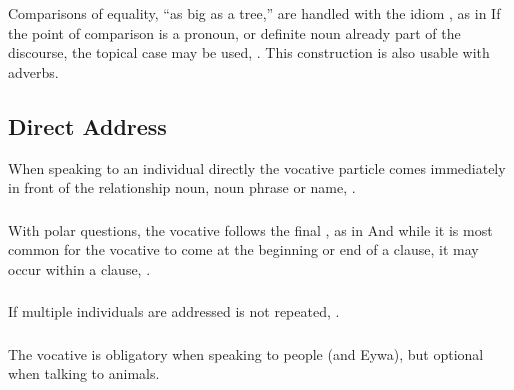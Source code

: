 \subsubsection{} Comparisons of equality, ``as big as a tree,'' are
handled with the idiom    , as in    If the point of comparison is a pronoun, or definite noun
already part of the discourse, the topical case may be used,
.  This construction is also usable
with adverbs.  \label{syntax:adj-eql-comp}


\subsection{Direct Address}
When speaking to an individual directly the vocative particle 
comes immediately in front of the relationship noun, noun phrase or
name,    .

\subsubsection{} With polar questions, the vocative follows the
final , as in    And while it is most common for the vocative to come at
the beginning or end of a clause, it may occur within a
clause,  .

\subsubsection{} If multiple individuals are addressed  is not
repeated,  .

\subsubsection{}
The vocative is obligatory when speaking to people (and Eywa), but
optional when talking to animals.

